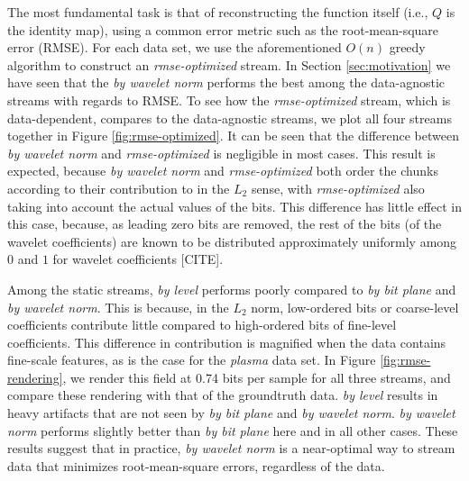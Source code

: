 The most fundamental task is that of reconstructing the function itself (i.e., $Q$ is the identity
map), using a common error metric such as the root-mean-square error (RMSE). For each data set, we
use the aforementioned $O(n)$ greedy algorithm to construct an \emph{rmse-optimized} stream. In
Section \ref{sec:motivation} we have seen that the \emph{by wavelet norm} performs the best among
the data-agnostic streams with regards to RMSE. To see how the \emph{rmse-optimized} stream, which
is data-dependent, compares to the data-agnostic streams, we plot all four streams together in
Figure \ref{fig:rmse-optimized}. It can be seen that the difference between \emph{by wavelet norm}
and \emph{rmse-optimized} is negligible in most cases. This result is expected, because \emph{by
wavelet norm} and \emph{rmse-optimized} both order the chunks according to their contribution to in
the $L_2$ sense, with \emph{rmse-optimized} also taking into account the actual values of the bits.
This difference has little effect in this case, because, as leading zero bits are removed, the rest
of the bits (of the wavelet coefficients) are known to be distributed approximately uniformly among
$0$ and $1$ for wavelet coefficients [CITE]. 

Among the static streams, \emph{by level} performs poorly compared to \emph{by bit plane} and
\emph{by wavelet norm}. This is because, in the $L_2$ norm, low-ordered bits or coarse-level
coefficients contribute little compared to high-ordered bits of fine-level coefficients. This
difference in contribution is magnified when the data contains fine-scale features, as is the case
for the \emph{plasma} data set. In Figure \ref{fig:rmse-rendering}, we render this field at 0.74
bits per sample for all three streams, and compare these rendering with that of the groundtruth
data. \emph{by level} results in heavy artifacts that are not seen by \emph{by bit plane} and
\emph{by wavelet norm}. \emph{by wavelet norm} performs slightly better than \emph{by bit plane}
here and in all other cases. These results suggest that in practice, \emph{by wavelet norm} is a
near-optimal way to stream data that minimizes root-mean-square errors, regardless of the data.

